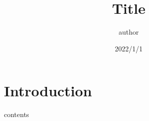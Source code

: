 \documentclass[uplatex, twocolumn,10pt]{jsarticle}
\begin{document}
\title{\bf{Title}}
\author{author}
\date{2022/1/1}
\maketitle

\section{Introduction}

contents
\end{document}
